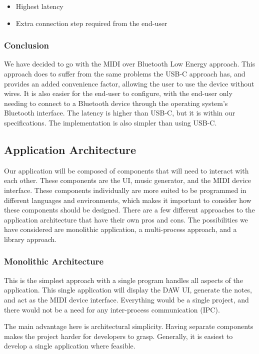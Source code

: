\begin{itemize}
  \item Highest latency
  \item Extra connection step required from the end-user
\end{itemize}

\subsubsection{Conclusion}

We have decided to go with the MIDI over Bluetooth Low Energy approach. This approach does
to suffer from the same problems the USB-C approach has, and provides an added convenience
factor, allowing the user to use the device without wires. It is also easier for the
end-user to configure, with the end-user only needing to connect to a Bluetooth device
through the operating system's Bluetooth interface. The latency is higher than USB-C, but
it is within our specifications. The implementation is also simpler than using USB-C.

\subsection{Application Architecture}
\label{sec:app_architecture}

Our application will be composed of components that will need to interact with each other.
These components are the UI, music generator, and the MIDI device interface. These
components individually are more suited to be programmed in different languages and
environments, which makes it important to consider how these components should be
designed. There are a few different approaches to the application architecture that have
their own pros and cons. The possibilities we have considered are monolithic application,
a multi-process approach, and a library approach.

\subsubsection{Monolithic Architecture}

This is the simplest approach with a single program handles all aspects of the
application. This single application will display the DAW UI, generate the notes, and act
as the MIDI device interface. Everything would be a single project, and there would not be
a need for any inter-process communication (IPC).

The main advantage here is architectural simplicity. Having separate components makes the
project harder for developers to grasp. Generally, it is easiest to develop a single
application where feasible.

